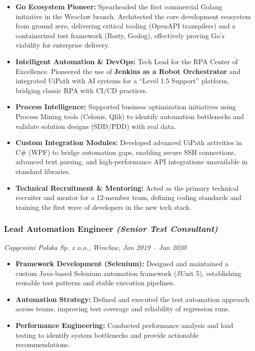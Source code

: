 \documentclass[10pt,a4paper]{article}
\providecommand{\tightlist}{%
  \setlength{\itemsep}{0pt}\setlength{\parskip}{0pt}}
\begin{document}
\begin{itemize}
\tightlist
\item
  \textbf{Go Ecosystem Pioneer:} Spearheaded the first commercial Golang
  initiative in the Wrocław branch. Architected the core development
  ecosystem from ground zero, delivering critical tooling (OpenAPI
  transpilers) and a containerized test framework (Resty, Godog),
  effectively proving Go's viability for enterprise delivery.
\item
  \textbf{Intelligent Automation \& DevOps:} Tech Lead for the RPA
  Center of Excellence. Pioneered the use of \textbf{Jenkins as a Robot
  Orchestrator} and integrated UiPath with AI systems for a ``Level 1.5
  Support'' platform, bridging classic RPA with CI/CD practices.
\item
  \textbf{Process Intelligence:} Supported business optimization
  initiatives using Process Mining tools (Celonis, Qlik) to identify
  automation bottlenecks and validate solution designs (SDD/PDD) with
  real data.
\item
  \textbf{Custom Integration Modules:} Developed advanced UiPath
  activities in C\# (WPF) to bridge automation gaps, enabling secure SSH
  connections, advanced text parsing, and high-performance API
  integrations unavailable in standard libraries.
\item
  \textbf{Technical Recruitment \& Mentoring:} Acted as the primary
  technical recruiter and mentor for a 12-member team, defining coding
  standards and training the first wave of developers in the new tech
  stack.
\end{itemize}

\subsubsection{\texorpdfstring{Lead Automation Engineer \emph{(Senior
Test
Consultant)}}{Lead Automation Engineer (Senior Test Consultant)}}\label{lead-automation-engineer-senior-test-consultant}

\emph{Capgemini Polska Sp. z o.o., Wrocław, Jan 2019 -- Jun 2020}

\begin{itemize}
\tightlist
\item
  \textbf{Framework Development (Selenium):} Designed and maintained a
  custom Java-based Selenium automation framework (JUnit 5),
  establishing reusable test patterns and stable execution pipelines.
\item
  \textbf{Automation Strategy:} Defined and executed the test automation
  approach across teams, improving test coverage and reliability of
  regression runs.
\item
  \textbf{Performance Engineering:} Conducted performance analysis and
  load testing to identify system bottlenecks and provide actionable
  recommendations.
\end{itemize}
\end{document}
